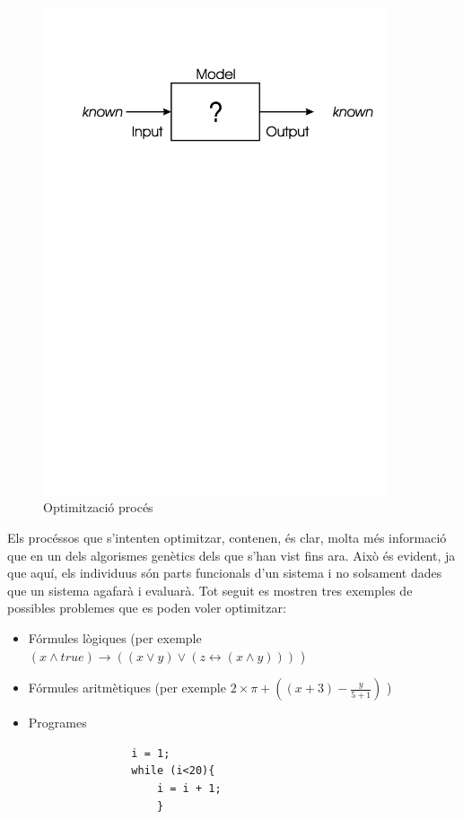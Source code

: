 \documentclass[titlepage,a4paper,12pt]{book}
\begin{document}
\begin{figure} \centering \includegraphics[width=4in]{intro/1-5.jpg}
\caption{\label{fig:ch1-5}Optimització procés}
\end{figure}

Els procéssos que s'intenten optimitzar, contenen, és clar, molta més informació
que en un dels algorismes genètics dels que s'han vist fins ara.  Això és
evident, ja que aquí, els individuus són parts funcionals d'un sistema i no
solsament dades que un sistema agafarà i evaluarà.  Tot seguit es mostren tres
exemples de possibles problemes que es poden voler optimitzar:

\begin{itemize}
	\item Fórmules lògiques (per exemple $ (x\land true) \rightarrow ((x \lor y)
	\lor (z \leftrightarrow ( x \land y)))$ )
	\item Fórmules aritmètiques (per exemple $2\times\pi+((x+3)-\frac{y}{5+1})$ )
	\item Programes 
		\begin{verbatim}
				i = 1;
				while (i<20){
					i = i + 1;
					}
		\end{verbatim}
\end{itemize}
\end{document}
